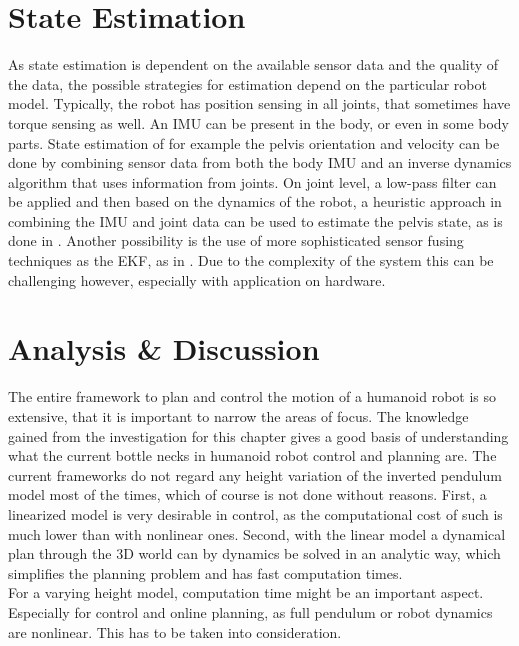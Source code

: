 \section{State Estimation} 
As state estimation is dependent on the available sensor data and the quality of the data, the possible strategies for estimation depend on the particular robot model. Typically, the robot has position sensing in all joints, that sometimes have torque sensing as well. An \ac{IMU} can be present in the body, or even in some body parts. State estimation of for example the pelvis orientation and velocity can be done by combining sensor data from both the body \ac{IMU} and an inverse dynamics algorithm that uses information from joints. On joint level, a low-pass filter can be applied and then based on the dynamics of the robot, a heuristic approach in combining the \ac{IMU} and joint data can be used to estimate the pelvis state, as is done in \cite{koolen2016design}. Another possibility is the use of more sophisticated sensor fusing techniques as the \ac{EKF}, as in \cite{kuindersma2016optimization}. Due to the complexity of the system this can be challenging however, especially with application on hardware. 

\section{Analysis \& Discussion}
The entire framework to plan and control the motion of a humanoid robot is so extensive, that it is important to narrow the areas of focus. The knowledge gained from the investigation for this chapter gives a good basis of understanding what the current bottle necks in humanoid robot control and planning are. The current frameworks do not regard any height variation of the inverted pendulum model most of the times, which of course is not done without reasons. First, a linearized model is very desirable in control, as the computational cost of such is much lower than with nonlinear ones. Second, with the linear model a dynamical plan through the \ac{3D} world can by dynamics be solved in an analytic way, which simplifies the planning problem and has fast computation times. \\
For a varying height model, computation time might be an important aspect. Especially for control and online planning, as full pendulum or robot dynamics are nonlinear. This has to be taken into consideration. 